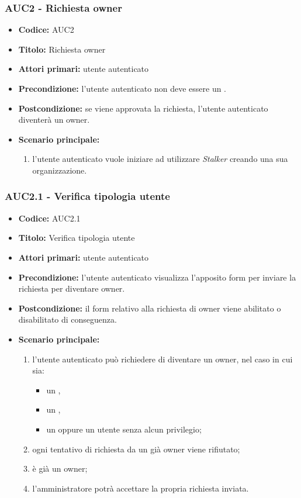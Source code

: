 \documentclass[casi-duso]{subfiles}
\begin{document}
\subsubsection{AUC2 - Richiesta owner}%
\label{subsub:AUC2}
\begin{itemize}
  \item \textbf{Codice:} AUC2
  \item \textbf{Titolo:} Richiesta owner
  \item \textbf{Attori primari:} utente autenticato
  \item \textbf{Precondizione:} l'utente autenticato non deve essere un .
  \item \textbf{Postcondizione:} se viene approvata la richiesta, l'utente autenticato diventerà un owner.
  \item \textbf{Scenario principale:}
  \begin{enumerate}
    \item l'utente autenticato vuole iniziare ad utilizzare \emph{Stalker} creando una sua organizzazione.
  \end{enumerate}
\end{itemize}

\subsubsection{AUC2.1 - Verifica tipologia utente}%
\label{subsub:AUC2.1}
\begin{itemize}
  \item \textbf{Codice:} AUC2.1
  \item \textbf{Titolo:} Verifica tipologia utente
  \item \textbf{Attori primari:} utente autenticato
  \item \textbf{Precondizione:} l'utente autenticato visualizza l'apposito form per inviare la richiesta per diventare owner.
  \item \textbf{Postcondizione:} il form relativo alla richiesta di owner viene abilitato o disabilitato di conseguenza.
  \item \textbf{Scenario principale:}
  \begin{enumerate}
    \item l'utente autenticato può richiedere di diventare un owner, nel caso in cui sia:
    \begin{itemize}
      \item un ,
      \item un ,
      \item un  oppure un utente senza alcun privilegio;
    \end{itemize}
    \item ogni tentativo di richiesta da un già owner viene rifiutato;
    \item {} è già un owner;
    \item l'amministratore potrà accettare la propria richiesta inviata.
  \end{enumerate}
\end{itemize}
\end{document}
